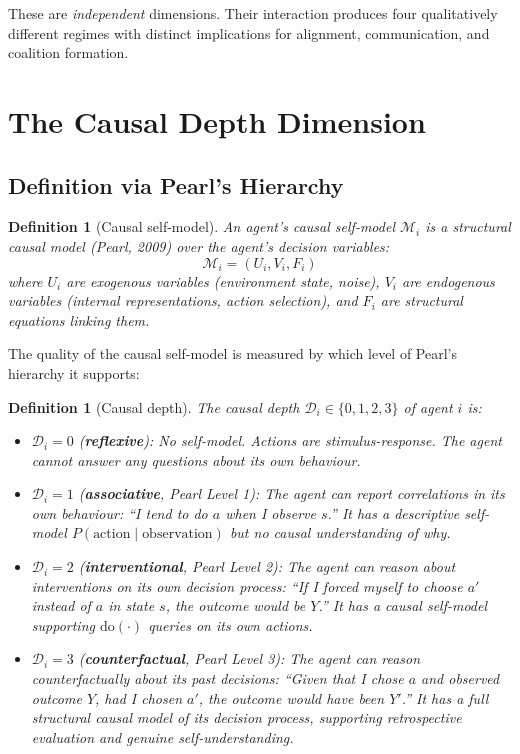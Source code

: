 \documentclass[11pt,a4paper]{article}
\newtheorem{definition}[theorem]{Definition}
\begin{document}
These are \emph{independent} dimensions. Their interaction produces
four qualitatively different regimes with distinct implications for
alignment, communication, and coalition formation.


\section{The Causal Depth Dimension}

\subsection{Definition via Pearl's Hierarchy}

\begin{definition}[Causal self-model]\label{def:causal-model}
An agent's \emph{causal self-model} $\mathcal{M}_i$ is a structural
causal model (Pearl, 2009) over the agent's decision variables:
\begin{equation}
    \mathcal{M}_i = (U_i, V_i, F_i)
\end{equation}
where $U_i$ are exogenous variables (environment state, noise),
$V_i$ are endogenous variables (internal representations, action
selection), and $F_i$ are structural equations linking them.
\end{definition}

The quality of the causal self-model is measured by which level of
Pearl's hierarchy it supports:

\begin{definition}[Causal depth]\label{def:causal-depth}
The causal depth $\mathcal{D}_i \in \{0, 1, 2, 3\}$ of agent $i$ is:
\begin{itemize}
    \item $\mathcal{D}_i = 0$ (\textbf{reflexive}): No self-model.
    Actions are stimulus-response. The agent cannot answer any
    questions about its own behaviour.

    \item $\mathcal{D}_i = 1$ (\textbf{associative}, Pearl Level 1):
    The agent can report correlations in its own behaviour:
    ``I tend to do $a$ when I observe $s$.'' It has a \emph{descriptive}
    self-model $P(\text{action} \mid \text{observation})$ but no causal
    understanding of why.

    \item $\mathcal{D}_i = 2$ (\textbf{interventional}, Pearl Level 2):
    The agent can reason about interventions on its own decision process:
    ``If I \emph{forced} myself to choose $a'$ instead of $a$ in state $s$,
    the outcome would be $Y$.'' It has a causal self-model supporting
    $\text{do}(\cdot)$ queries on its own actions.

    \item $\mathcal{D}_i = 3$ (\textbf{counterfactual}, Pearl Level 3):
    The agent can reason counterfactually about its past decisions:
    ``Given that I chose $a$ and observed outcome $Y$, \emph{had I
    chosen} $a'$, the outcome would have been $Y'$.'' It has a full
    structural causal model of its decision process, supporting
    retrospective evaluation and genuine self-understanding.
\end{itemize}
\end{definition}
\end{document}
